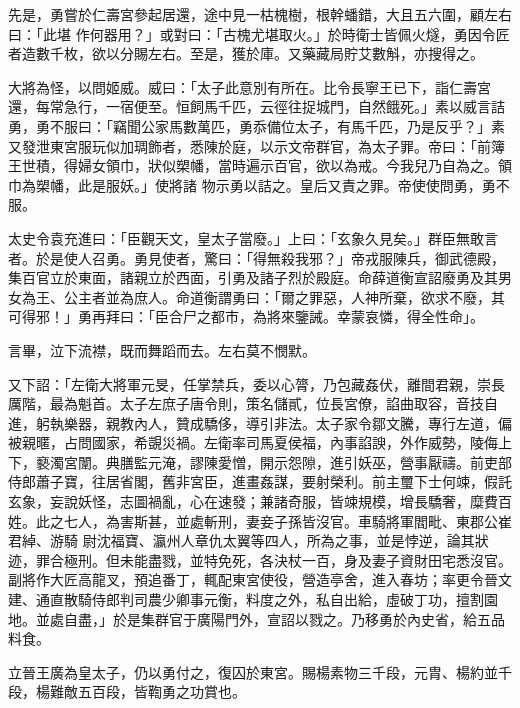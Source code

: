 \begin{pinyinscope}
 先是，勇嘗於仁壽宮參起居還，途中見一枯槐樹，根幹蟠錯，大且五六圍，顧左右曰：「此堪
 作何器用？」或對曰：「古槐尤堪取火。」於時衛士皆佩火燧，勇因令匠者造數千枚，欲以分賜左右。至是，獲於庫。又藥藏局貯艾數斛，亦搜得之。



 大將為怪，以問姬威。威曰：「太子此意別有所在。比令長寧王已下，詣仁壽宮還，每常急行，一宿便至。恒飼馬千匹，云徑往捉城門，自然餓死。」素以威言詰勇，勇不服曰：「竊聞公家馬數萬匹，勇忝備位太子，有馬千匹，乃是反乎？」素又發泄東宮服玩似加琱飾者，悉陳於庭，以示文帝群官，為太子罪。帝曰：「前簿王世積，得婦女領巾，狀似槊幡，當時遍示百官，欲以為戒。今我兒乃自為之。領巾為槊幡，此是服妖。」使將諸
 物示勇以詰之。皇后又責之罪。帝使使問勇，勇不服。



 太史令袁充進曰：「臣觀天文，皇太子當廢。」上曰：「玄象久見矣。」群臣無敢言者。於是使人召勇。勇見使者，驚曰：「得無殺我邪？」帝戎服陳兵，御武德殿，集百官立於東面，諸親立於西面，引勇及諸子烈於殿庭。命薛道衡宣詔廢勇及其男女為王、公主者並為庶人。命道衡謂勇曰：「爾之罪惡，人神所棄，欲求不廢，其可得邪！」勇再拜曰：「臣合尸之都市，為將來鑒誡。幸蒙哀憐，得全性命」。



 言畢，泣下流襟，既而舞蹈而去。左右莫不憫默。



 又下詔：「左衛大將軍元旻，任掌禁兵，委以心膂，乃包藏姦伏，離間君親，崇長
 厲階，最為魁首。太子左庶子唐令則，策名儲貳，位長宮僚，諂曲取容，音技自進，躬執樂器，親教內人，贊成驕侈，導引非法。太子家令鄒文騰，專行左道，偏被親暱，占問國家，希覬災禍。左衛率司馬夏侯福，內事諂諛，外作威勢，陵侮上下，褻濁宮闈。典膳監元淹，謬陳愛憎，開示怨隙，進引妖巫，營事厭禱。前吏部侍郎蕭子寶，往居省閣，舊非宮臣，進畫姦謀，要射榮利。前主璽下士何竦，假託玄象，妄說妖怪，志圖禍亂，心在速發；兼諸奇服，皆竦規模，增長驕奢，糜費百姓。此之七人，為害斯甚，並處斬刑，妻妾子孫皆沒官。車騎將軍閻毗、東郡公崔君綽、游騎
 尉沈福寶、瀛州人章仇太翼等四人，所為之事，並是悖逆，論其狀迹，罪合極刑。但未能盡戮，並特免死，各決杖一百，身及妻子資財田宅悉沒官。副將作大匠高龍叉，預追番丁，輒配東宮使役，營造亭舍，進入春坊；率更令晉文建、通直散騎侍郎判司農少卿事元衡，料度之外，私自出給，虛破丁功，擅割園地。並處自盡，」於是集群官于廣陽門外，宣詔以戮之。乃移勇於內史省，給五品料食。



 立晉王廣為皇太子，仍以勇付之，復囚於東宮。賜楊素物三千段，元胄、楊約並千段，楊難敵五百段，皆鞫勇之功賞也。




\end{pinyinscope}
